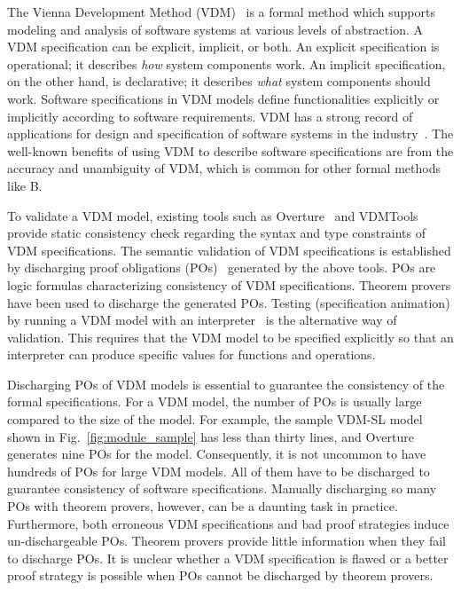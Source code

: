 The Vienna Development Method (VDM)~\cite{Jones:1990:SSD:94062,Fitzgerald:2005:VDO:1044891,Fitz:PGLarson:2009book} is a formal method which supports modeling and analysis of software systems at various levels of abstraction. A VDM specification can be explicit, implicit, or both. An explicit specification is operational; it describes \emph{how} system components work. An implicit specification, on the other hand, is declarative; it describes \emph{what} system components should work. Software specifications in VDM models define functionalities explicitly or implicitly according to software requirements. VDM has a strong record of applications for design and specification of software systems in the industry~\cite{Larsen:2007:RIA:2227886.2227894,DBLP:conf/fm/KuritaCN08,DBLP:journals/ijsi/KuritaN09}. The well-known benefits of using VDM to describe software specifications are from the accuracy and unambiguity of VDM, which is common for other formal methods like B. 

To validate a VDM model, existing tools such as Overture~\cite{Larsen:2010:OII:1668862.1668864} and VDMTools provide static consistency check regarding the syntax and type constraints of VDM specifications. The semantic validation of VDM specifications is established by discharging proof obligations (POs)~\cite{AL:97:POGV} generated by the above tools. POs are logic formulas characterizing consistency of VDM specifications. Theorem provers have been used to discharge the generated POs. Testing (specification animation) by running a VDM model with an interpreter~\cite{Prehn:1991:LNCS551} is the alternative way of validation. This requires that the VDM model to be specified explicitly so that an interpreter can produce specific values for functions and operations.

Discharging POs of VDM models is essential to guarantee the consistency of the formal specifications. For a VDM model, the number of POs is usually large compared to the size of the model. For example, the sample VDM-SL model shown in Fig.~\ref{fig:module_sample} has less than thirty lines, and Overture generates nine POs for the model. Consequently, it is not uncommon to have hundreds of POs for large VDM models. All of them have to be discharged to guarantee consistency of software specifications. Manually discharging so many POs with theorem provers, however, can be a daunting task in practice. Furthermore, both erroneous VDM specifications and bad proof strategies induce un-dischargeable POs. Theorem provers provide little information when they fail to discharge POs. It is unclear whether a VDM specification is flawed or a better proof strategy is possible when POs cannot be discharged by theorem provers.

